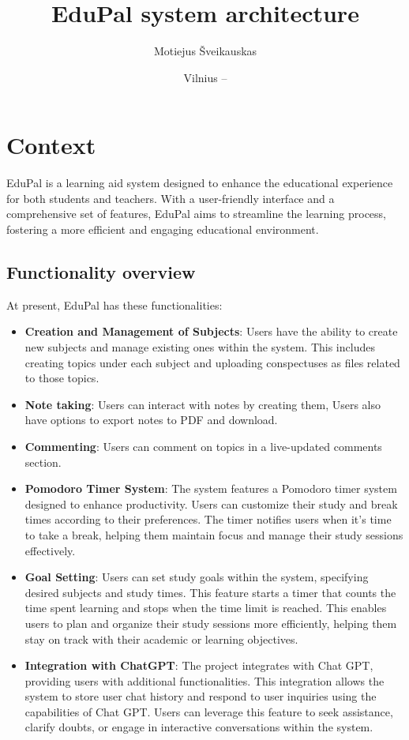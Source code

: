 \documentclass[
    english, %
]{VUMIFPSkursinis}
\title{EduPal system architecture}
\author{Motiejus Šveikauskas}
\date{Vilnius – \the\year}
\begin{document}
\maketitle

\tableofcontents

\section{Context}
EduPal is a learning aid system designed to enhance
the educational experience for both students and teachers. With a user-friendly interface and a comprehensive set of features, EduPal aims to streamline the learning process, fostering a more efficient and engaging educational environment.

\subsection{Functionality overview}

At present, EduPal has these functionalities:

\begin{itemize}
    \item \textbf{Creation and Management of Subjects}: Users have the ability to create new subjects and manage existing ones within the system. This includes creating topics under each subject and uploading conspectuses as files related to those topics.
    \item \textbf{Note taking}: Users can interact with notes by creating them, Users also have options to export notes to PDF and download.
    \item \textbf{Commenting}: Users can comment on topics in a live-updated comments section.
    \item \textbf{Pomodoro Timer System}: The system features a Pomodoro timer system designed to enhance productivity. Users can customize their study and break times according to their preferences. The timer notifies users when it's time to take a break, helping them maintain focus and manage their study sessions effectively.
    \item \textbf{Goal Setting}: Users can set study goals within the system, specifying desired subjects and study times. This feature starts a timer that counts the time spent learning and stops when the time limit is reached. This enables users to plan and organize their study sessions more efficiently, helping them stay on track with their academic or learning objectives.
    \item \textbf{Integration with ChatGPT}: The project integrates with Chat GPT, providing users with additional functionalities. This integration allows the system to store user chat history and respond to user inquiries using the capabilities of Chat GPT. Users can leverage this feature to seek assistance, clarify doubts, or engage in interactive conversations within the system.
\end{itemize}
\end{document}
